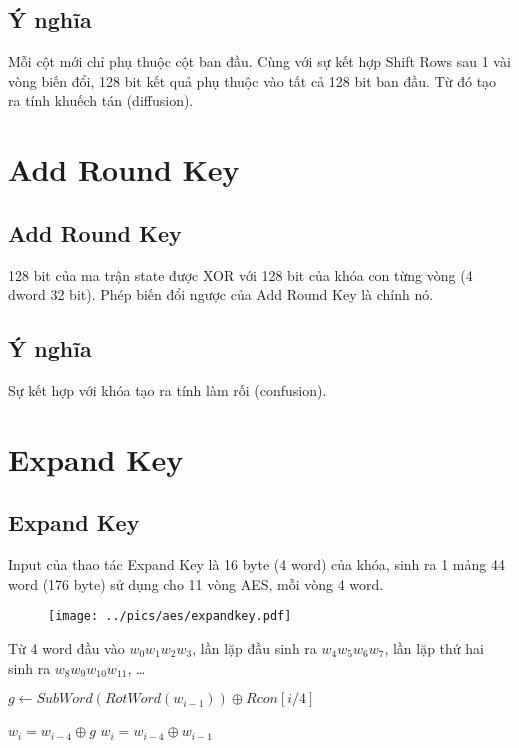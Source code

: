 \subsection{Ý nghĩa}

Mỗi cột mới chỉ phụ thuộc cột ban đầu. Cùng với sự kết hợp Shift Rows sau 1 vài vòng biến đổi, 128 bit kết quả phụ thuộc vào tất cả 128 bit ban đầu.
Từ đó tạo ra tính khuếch tán (diffusion).

\section{Add Round Key}

\subsection{Add Round Key}

128 bit của ma trận state được XOR với 128 bit của khóa con từng vòng (4 dword 32 bit). Phép biến đổi ngược của Add Round Key là chính nó.

\subsection{Ý nghĩa}

Sự kết hợp với khóa tạo ra tính làm rối (confusion).

\section{Expand Key}

\subsection{Expand Key}

Input của thao tác Expand Key là 16 byte (4 word) của khóa, sinh ra 1 mảng 44 word (176 byte) sử dụng cho 11 vòng AES, mỗi vòng 4 word.

\begin{figure}[ht]
    \centering
    \texttt{[image: ../pics/aes/expandkey.pdf]}
\end{figure}

Từ 4 word đầu vào $w_0 w_1 w_2 w_3$, lần lặp đầu sinh ra $w_4 w_5 w_6 w_7$, lần lặp thứ hai sinh ra $w_8 w_9 w_{10} w_{11}$, \dots

\begin{algorithmic}
        \State $g \gets SubWord(RotWord(w_{i-1})) \oplus Rcon[i/4]$

        \State $w_i = w_{i-4} \oplus g$
    \Else
        \State $w_i = w_{i-4} \oplus w_{i-1}$
    \EndIf
\end{algorithmic}

